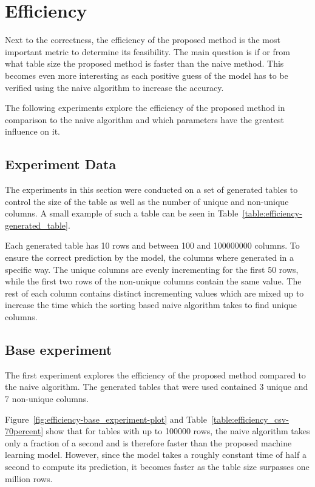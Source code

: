 \section{Efficiency}\label{sec:efficiency}
Next to the correctness, the efficiency of the proposed method is the most important metric to determine its feasibility. %
The main question is if or from what table size the proposed method is faster than the naive method. This becomes even more interesting as each positive guess of the model has to be verified using the naive algorithm to increase the accuracy.

The following experiments explore the efficiency of the proposed method in comparison to the naive algorithm and which parameters have the greatest influence on it.


\subsection{Experiment Data}\label{subsec:efficiency-experiment_data}
The experiments in this section were conducted on a set of generated tables to control the size of the table as well as the number of unique and non-unique columns. A small example of such a table can be seen in Table~\ref{table:efficiency-generated_table}.

Each generated table has \num{10} rows and between \num{100} and \num{100000000} columns. To ensure the correct prediction by the model, the columns where generated in a specific way.
The unique columns are evenly incrementing for the first \num{50} rows, while the first two rows of the non-unique columns contain the same value. The rest of each column contains distinct incrementing values which are mixed up to increase the time which the sorting based naive algorithm takes to find unique columns.




\subsection{Base experiment}\label{subsec:efficiency-base_experiment}
The first experiment explores the efficiency of the proposed method compared to the naive algorithm. The generated tables that were used contained \num{3} unique and \num{7} non-unique columns.  %

Figure~\ref{fig:efficiency-base_experiment-plot} and Table~\ref{table:efficiency_csv-70percent} show that for tables with up to \num{100000} rows, the naive algorithm takes only a fraction of a second and is therefore faster than the proposed machine learning model. However, since the model takes a roughly constant time of half a second to compute its prediction, it becomes faster as the table size surpasses one million rows.

